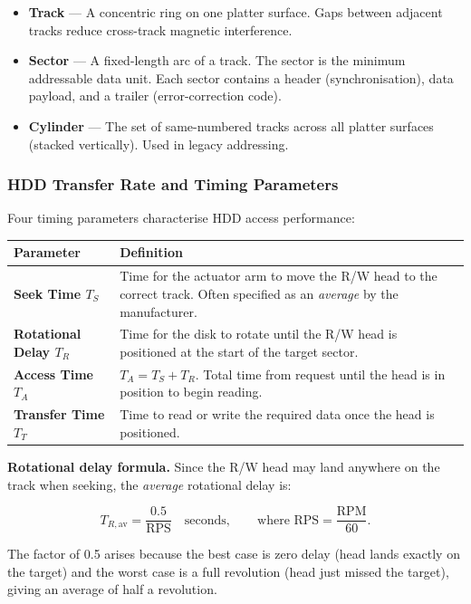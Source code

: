 \documentclass[11pt, a4paper, notitlepage]{report}
\theoremstyle{definition}
\theoremstyle{remark}
\theoremstyle{definition}
\begin{document}
\begin{itemize}
  \item \textbf{Track} — A concentric ring on one platter surface. Gaps between adjacent tracks reduce cross-track magnetic interference.
  \item \textbf{Sector} — A fixed-length arc of a track. The sector is the minimum addressable data unit. Each sector contains a header (synchronisation), data payload, and a trailer (error-correction code).
  \item \textbf{Cylinder} — The set of same-numbered tracks across all platter surfaces (stacked vertically). Used in legacy addressing.
\end{itemize}

\subsubsection{HDD Transfer Rate and Timing Parameters}
\label{sec:hdd-timing}

Four timing parameters characterise HDD access performance:

\begin{center}
\renewcommand{\arraystretch}{1.3}
\begin{tabular}{>{\bfseries}lp{}}
  \toprule
  Parameter & Definition \\
  \midrule
  Seek Time $T_S$ & Time for the actuator arm to move the R/W head to the correct track. Often specified as an \emph{average} by the manufacturer. \\
  Rotational Delay $T_R$ & Time for the disk to rotate until the R/W head is positioned at the start of the target sector. \\
  Access Time $T_A$ & $T_A = T_S + T_R$. Total time from request until the head is in position to begin reading. \\
  Transfer Time $T_T$ & Time to read or write the required data once the head is positioned. \\
  \bottomrule
\end{tabular}
\end{center}

\textbf{Rotational delay formula.} Since the R/W head may land anywhere on the track when seeking, the \emph{average} rotational delay is:

\[
  T_{R,\text{av}} = \frac{0.5}{\text{RPS}} \quad \text{seconds}, \qquad \text{where } \text{RPS} = \frac{\text{RPM}}{60}.
\]

The factor of 0.5 arises because the best case is zero delay (head lands exactly on the target) and the worst case is a full revolution (head just missed the target), giving an average of half a revolution.
\end{document}
